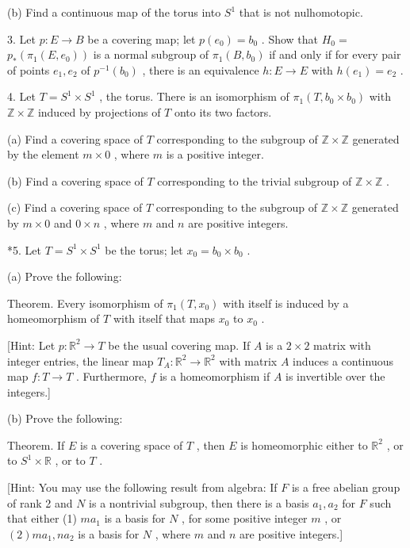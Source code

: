 (b) Find a continuous map of the torus into \({S}^{1}\) that is not nulhomotopic.

3. Let \(p : E \rightarrow  B\) be a covering map; let \(p\left( {e}_{0}\right)  = {b}_{0}\) . Show that \({H}_{0} =\)  \({p}_{ * }\left( {{\pi }_{1}\left( {E,{e}_{0}}\right) }\right)\) is a normal subgroup of \({\pi }_{1}\left( {B,{b}_{0}}\right)\) if and only if for every pair of points \({e}_{1},{e}_{2}\) of \({p}^{-1}\left( {b}_{0}\right)\) , there is an equivalence \(h : E \rightarrow  E\) with \(h\left( {e}_{1}\right)  = {e}_{2}\) .

4. Let \(T = {S}^{1} \times  {S}^{1}\) , the torus. There is an isomorphism of \({\pi }_{1}\left( {T,{b}_{0} \times  {b}_{0}}\right)\) with \(\mathbb{Z} \times  \mathbb{Z}\) induced by projections of \(T\) onto its two factors.

(a) Find a covering space of \(T\) corresponding to the subgroup of \(\mathbb{Z} \times  \mathbb{Z}\) generated by the element \(m \times  0\) , where \(m\) is a positive integer.

(b) Find a covering space of \(T\) corresponding to the trivial subgroup of \(\mathbb{Z} \times  \mathbb{Z}\) .

(c) Find a covering space of \(T\) corresponding to the subgroup of \(\mathbb{Z} \times  \mathbb{Z}\) generated by \(m \times  0\) and \(0 \times  n\) , where \(m\) and \(n\) are positive integers.

*5. Let \(T = {S}^{1} \times  {S}^{1}\) be the torus; let \({x}_{0} = {b}_{0} \times  {b}_{0}\) .

(a) Prove the following:

Theorem. Every isomorphism of \({\pi }_{1}\left( {T,{x}_{0}}\right)\) with itself is induced by a homeomorphism of \(T\) with itself that maps \({x}_{0}\) to \({x}_{0}\) .

[Hint: Let \(p : {\mathbb{R}}^{2} \rightarrow  T\) be the usual covering map. If \(A\) is a \(2 \times  2\) matrix with integer entries, the linear map \({T}_{A} : {\mathbb{R}}^{2} \rightarrow  {\mathbb{R}}^{2}\) with matrix \(A\) induces a continuous map \(f : T \rightarrow  T\) . Furthermore, \(f\) is a homeomorphism if \(A\) is invertible over the integers.]

(b) Prove the following:

Theorem. If \(E\) is a covering space of \(T\) , then \(E\) is homeomorphic either to \({\mathbb{R}}^{2}\) , or to \({S}^{1} \times  \mathbb{R}\) , or to \(T\) .

[Hint: You may use the following result from algebra: If \(F\) is a free abelian group of rank 2 and \(N\) is a nontrivial subgroup, then there is a basis \({a}_{1},{a}_{2}\) for \(F\) such that either (1) \(m{a}_{1}\) is a basis for \(N\) , for some positive integer \(m\) , or \(\left( 2\right) m{a}_{1},n{a}_{2}\) is a basis for \(N\) , where \(m\) and \(n\) are positive integers.]

